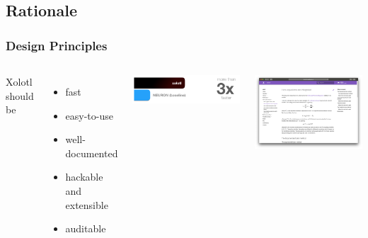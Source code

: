 \documentclass{beamer}
\begin{document}
\subsection{Rationale}


\begin{frame}
  \frametitle{Design Principles}

  \begin{columns}

    Xolotl should be

    \begin{itemize}
      \item fast
      \item easy-to-use
      \item well-documented
      \item hackable and extensible
      \item auditable
    \end{itemize}


    \includegraphics[width=\textwidth]{gfx/fast.png}
    \centering

    \includegraphics[width=\textwidth]{gfx/documentation.png}
    \centering

  \end{columns}

\end{frame}
\end{document}
